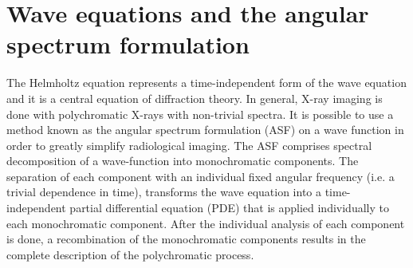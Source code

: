 \documentclass[10pt, a4paper, singlespacing]{report}
\begin{document}
\section{Wave equations and the angular spectrum formulation}\label{ASF}
The Helmholtz equation represents a time-independent form of the wave equation and it is a central equation of diffraction theory\cite{CH49}\cite{Pags2006}.
In general, X-ray imaging is done with polychromatic X-rays with non-trivial spectra\cite{CH49}. It is possible to use a method known as the angular spectrum formulation (ASF) on a wave function in order to greatly simplify radiological imaging. The ASF comprises spectral decomposition of a wave-function into monochromatic components. The separation of each component with an individual fixed angular frequency (i.e. a trivial dependence in time), transforms the wave equation into a time-independent partial differential equation (PDE) that is applied individually to each monochromatic component. After the individual analysis of each component is done, a recombination of the monochromatic components results in the complete description of the polychromatic process\cite{CH49}\cite{Pags2006}.
\end{document}
